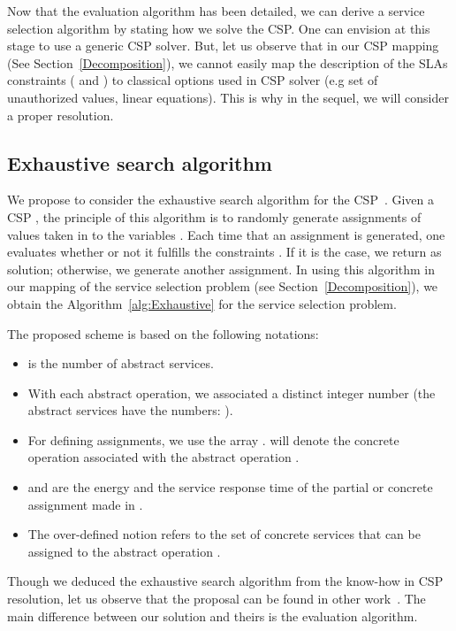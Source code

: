 \documentclass[a4paper]{article}
\begin{document}
Now that the evaluation algorithm has been detailed, we can derive a service selection algorithm 
by stating how we solve the CSP. One can envision at this stage to use a generic CSP solver. 
But, let us observe that in our CSP mapping (See Section~\ref{Decomposition}), we cannot easily map the 
description of the SLAs constraints ( and 
) to classical options used in CSP solver (e.g set of unauthorized values, linear equations).  
This is why in the sequel, we will consider a proper resolution.


\subsection{Exhaustive search algorithm}

We propose to consider the exhaustive search algorithm for the CSP~\cite{Baker95intelligentbacktracking,DBLP:journals/concurrency/Estevez-AyresGBD11}. Given a CSP ,  the principle of this algorithm is to randomly 
generate assignments of values taken in  to the variables . Each time that an assignment  is generated, 
one evaluates whether or not it fulfills the constraints . If it is the case, we return  as 
solution; otherwise, we generate another assignment. 
In using this algorithm in our mapping of the service selection problem (see Section~\ref{Decomposition}), 
we obtain the Algorithm~\ref{alg:Exhaustive} for the service selection problem. 

The proposed scheme is based on the following notations:
\begin{itemize}
\item  is the number of abstract services.
\item With each abstract operation, we associated a distinct integer number (the abstract services have the numbers:  
). 
\item For defining assignments, we use the array .  will denote the concrete operation  
associated with the abstract operation .
\item  and  are the energy and the service response time of the partial or 
concrete assignment made in .
\item The over-defined notion  refers to the set of concrete services that can be assigned to 
the abstract operation .
\end{itemize}

Though we deduced the exhaustive search algorithm from the know-how in CSP resolution, let us observe 
that the proposal can be found in other work~\cite{DBLP:journals/concurrency/Estevez-AyresGBD11,Yu:2004:SSA:1018413.1019049}. 
The main difference between our solution and theirs is the evaluation algorithm. 
\end{document}
